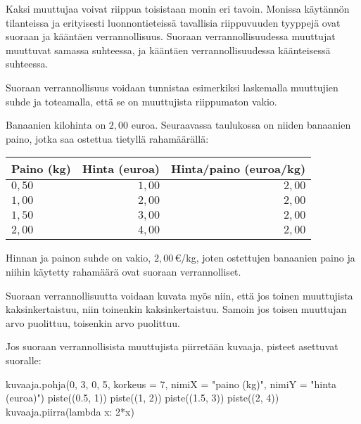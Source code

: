 Kaksi muuttujaa voivat riippua toisistaan monin eri tavoin. Monissa käytännön tilanteissa ja erityisesti luonnontieteissä tavallisia riippuvuuden tyyppejä ovat suoraan ja kääntäen verrannollisuus. Suoraan verrannollisuudessa muuttujat muuttuvat samassa suhteessa, ja kääntäen verrannollisuudessa käänteisessä suhteessa.


Suoraan verrannollisuus voidaan tunnistaa esimerkiksi laskemalla muuttujien suhde ja toteamalla, että se on muuttujista riippumaton vakio.

\begin{esimerkki}
Banaanien kilohinta on $2,00$ euroa. Seuraavassa taulukossa on niiden banaanien paino, jotka saa ostettua tietyllä rahamäärällä:
\begin{center} 
\begin{tabular}{|l|r|r|}
\hline
Paino (kg) & Hinta (euroa) & Hinta/paino (euroa/kg) \\
\hline
$0,50$ & $1,00$ & $2,00$ \\
$1,00$ & $2,00$ & $2,00$ \\
$1,50$ & $3,00$ & $2,00$ \\
$2,00$ & $4,00$ & $2,00$ \\
\hline
\end{tabular}
\end{center}
Hinnan ja painon suhde on vakio, $2,00$\,€/kg, joten ostettujen banaanien paino ja niihin käytetty rahamäärä ovat suoraan verrannolliset.
\end{esimerkki}

Suoraan verrannollisuutta voidaan kuvata myös niin, että jos toinen muuttujista kaksinkertaistuu, niin toinenkin kaksinkertaistuu. Samoin jos toisen muuttujan arvo puolittuu, toisenkin arvo puolittuu.

Jos suoraan verrannollisista muuttujista piirretään kuvaaja, pisteet asettuvat suoralle:

\begin{center}
\begin{kuva}
    kuvaaja.pohja(0, 3, 0, 5, korkeus = 7, nimiX = "paino (kg)", nimiY = "hinta (euroa)")
    piste((0.5, 1))
    piste((1, 2))
    piste((1.5, 3))
    piste((2, 4))
    kuvaaja.piirra(lambda x: 2*x)
\end{kuva}
\end{center}

